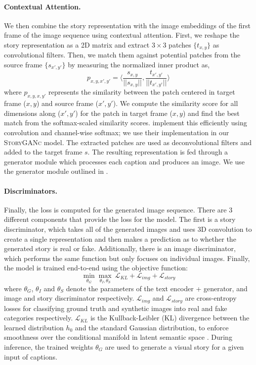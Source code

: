 \documentclass[runningheads]{llncs}
\newcommand{\sgan}[1]{\textsc{StoryGANc}}
\begin{document}
\paragraph{Contextual Attention.}
We then combine the story representation with the image embeddings of the first frame of the image sequence using contextual attention. First, we reshape the story representation as a 2D matrix and extract $3\times3$ patches $\{t_{x,y}\}$ as convolutional filters. Then, we match them against potential patches from the source frame $\{s_{x',y'}\}$ by measuring the normalized inner product as,
\begin{equation}
    p_{x,y,x',y'} = \langle \frac{s_{x,y}}{||s_{x,y}||},\frac{t_{x',y'}}{||t_{x',y'}||}\rangle
\end{equation}
where $p_{x,y,x,y'}$ represents the similarity between the patch centered in target frame ($x,y$) and source frame ($x',y'$). We compute the similarity score for all dimensions along ($x',y'$) for the patch in target frame ($x,y$) and find the best match from the softmax-scaled similarity scores. \cite{yu2018generative} implement this efficiently using convolution and channel-wise softmax; we use their implementation in our \sgan{} model. The extracted patches are used as deconvolutional filters and added to the target frame $s$. The resulting representation is fed through a generator module which processes each caption and produces an image. We use the generator module outlined in \cite{li2019storygan}.
\paragraph{Discriminators.}
Finally, the loss is computed for the generated image sequence. There are 3 different components that provide the loss for the model. The first is a story discriminator, which takes all of the generated images and uses 3D convolution to create a single representation and then makes a prediction as to whether the generated story is real or fake. Additionally, there is an image discriminator, which performs the same function but only focuses on individual images. Finally, the model is trained end-to-end using the objective function:
\begin{equation*}
    \min_{\theta_{G}} \max_{\theta_{I},\theta_{S}} \> \mathcal{L}_{KL} + \mathcal{L}_{img} + \mathcal{L}_{story}
\end{equation*}
where $\theta_{G}$, $\theta_{I}$ and $\theta_{S}$ denote the parameters of the text encoder + generator, and image and story discriminator respectively. $\mathcal{L}_{img}$ and $\mathcal{L}_{story}$ are cross-entropy losses for classifying ground truth and synthetic images into real and fake categories respectively. $\mathcal{L}_{KL}$ is the Kullback-Leibler (KL) divergence between the learned distribution $h_0$ and the standard Gaussian distribution, to enforce smoothness over the conditional manifold in latent semantic space \cite{li2019storygan}. During inference, the trained weights $\theta_{G}$ are used to generate a visual story for a given input of captions.
\end{document}
